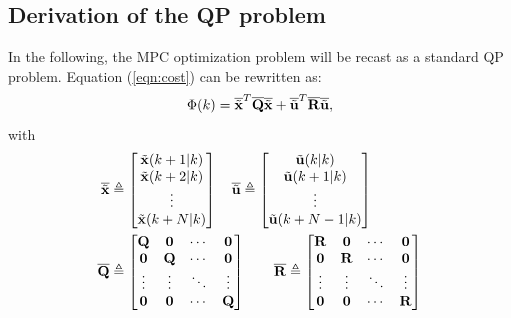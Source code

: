 \documentclass[twocolumn]{IEEEtran} %
\begin{document}
\subsection{Derivation of the QP problem}\label{sec:qp}
In the following, the MPC optimization problem will be recast as a standard QP problem. Equation (\ref{eqn:cost}) can be rewritten as:
\begin{equation}\label{eqn:cost2}
	\Phi(k) = \overline{\tilde{\bf x}}^T\overline{\bf Q}\overline{\tilde{\bf x}} + \overline{\tilde{\bf u}}^T\overline{\bf R}\overline{\tilde{\bf u}},
\end{equation}
with
\begin{align*}
	\overline{\tilde{\bf x}} &\triangleq \begin{bmatrix}
		\tilde{\bf x}(k+1|k) \\ \tilde{\bf x}(k+2|k) \\ \vdots \\ \tilde{\bf x}(k+N|k) 
	\end{bmatrix} \quad
	\overline{\tilde{\bf u}} \triangleq \begin{bmatrix}
		\tilde{\bf u}(k|k)  \\ \tilde{\bf u}(k+1|k) \\ \vdots \\ \tilde{\bf u}(k+N-1|k)
	\end{bmatrix} \\
	\overline {\bf Q} &\triangleq \begin{bmatrix}
		{\bf Q} & {\bf 0} & \cdots & {\bf 0} \\
		{\bf 0} & {\bf Q} & \cdots & {\bf 0} \\
		\vdots  & \vdots  & \ddots & \vdots  \\
		{\bf 0} & {\bf 0} & \cdots & {\bf Q} \\
	\end{bmatrix} \qquad
	\overline {\bf R} \triangleq \begin{bmatrix}
		{\bf R} & {\bf 0} & \cdots & {\bf 0} \\
		{\bf 0} & {\bf R} & \cdots & {\bf 0} \\
		\vdots  & \vdots  & \ddots & \vdots  \\
		{\bf 0} & {\bf 0} & \cdots & {\bf R} \\
	\end{bmatrix}
\end{align*}
\end{document}
